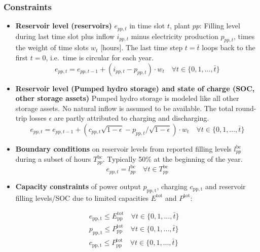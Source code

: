 \documentclass[]{article}
\begin{document}
\subsubsection{Constraints}\label{constraints}

\begin{itemize}
\item
  \textbf{Reservoir level (reservoirs)} $e_{pp,t}$ in time slot $t$,
  plant $pp$: Filling level during last time slot plus inflow $i_{pp,t}$
  minus electricity production $p_{pp,t}$, times the weight of time
  slots $w_t$ {[}hours{]}. The last time step $t=\bar t$ loops back to
  the first $t=0$, i.e.~time is circular for each year.
  \[ e_{pp,t} = e_{pp,t-1} + (i_{pp,t} - p_{pp,t})\cdot w_t \quad \forall t \in \{0, 1, ..., \bar t\}\]
\item
  \textbf{Reservoir level (Pumped hydro storage) and state of charge
  (SOC, other storage assets)} Pumped hydro storage is modeled like all
  other storage assets. No natural inflow is assumed to be available.
  The total round-trip losses $\epsilon$ are partly attributed to
  charging and discharging.
  \[ e_{pp,t} = e_{pp,t-1} + \left(c_{pp,t}\sqrt{1-\epsilon} - p_{pp,t}/\sqrt{1-\epsilon}\right) \cdot w_t \quad \forall t \in \{0, 1, ..., \bar t\}\]
\item
  \textbf{Boundary conditions} on reservoir levels from reported filling
  levels $l^\mathrm{bc}_{pp}$ during a subset of hours
  $T^\mathrm{bc}_{pp}$. Typically 50\% at the beginning of the year.
  \[ e_{pp,t} = l^\mathrm{bc}_{pp} \quad \forall t \in T^\mathrm{bc}_{pp}\]
\item
  \textbf{Capacity constraints} of power output $p_\mathrm{{pp},t}$,
  charging $c_\mathrm{{pp},t}$ and reservoir filling levels/SOC due to
  limited capacities $E^\mathrm{tot}$ and $P^\mathrm{tot}$:
\end{itemize}

\[\begin{aligned}
&e_\mathrm{{pp},t} \leqslant E^\mathrm{tot}_\mathrm{{pp}}  \quad \forall t \in \{0, 1, ..., \bar t\}\\
&p_\mathrm{{pp},t} \leqslant  P^\mathrm{tot}_\mathrm{{pp}}  \quad \forall t \in \{0, 1, ..., \bar t\}\\
&c_\mathrm{{pp},t} \leqslant  P^\mathrm{tot}_\mathrm{{pp}}  \quad \forall t \in \{0, 1, ..., \bar t\}
\end{aligned}\]
\end{document}
